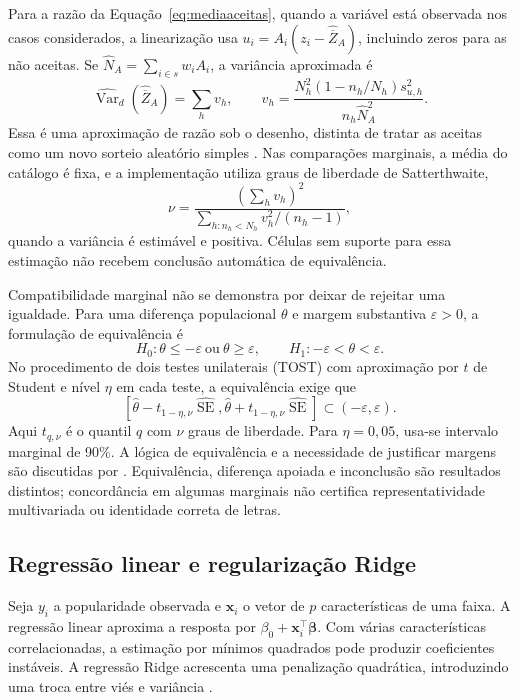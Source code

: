 Para a razão da Equação~\ref{eq:mediaaceitas}, quando a variável está observada nos casos considerados, a linearização usa $u_i=A_i(z_i-\widehat{\overline Z}_A)$, incluindo zeros para as não aceitas. Se $\widehat N_A=\sum_{i\in s}w_iA_i$, a variância aproximada é
\begin{equation}\label{eq:varianciarazao}
 \widehat{\operatorname{Var}}_d(\widehat{\overline Z}_A)=\sum_h v_h,
 \qquad v_h=\frac{N_h^2(1-n_h/N_h)s_{u,h}^2}{n_h\widehat N_A^2}.
\end{equation}
Essa é uma aproximação de razão sob o desenho, distinta de tratar as aceitas como um novo sorteio aleatório simples \cite{statcan2010}. Nas comparações marginais, a média do catálogo é fixa, e a implementação utiliza graus de liberdade de Satterthwaite,
\begin{equation}\label{eq:dfrazao}
 \nu=\frac{(\sum_hv_h)^2}{\sum_{h:n_h<N_h}v_h^2/(n_h-1)},
\end{equation}
quando a variância é estimável e positiva. Células sem suporte para essa estimação não recebem conclusão automática de equivalência.

Compatibilidade marginal não se demonstra por deixar de rejeitar uma igualdade. Para uma diferença populacional $\theta$ e margem substantiva $\varepsilon>0$, a formulação de equivalência é
\begin{equation}\label{eq:equivalencia}
 H_0:\theta\le-\varepsilon\ \text{ou}\ \theta\ge\varepsilon,
 \qquad H_1:-\varepsilon<\theta<\varepsilon.
\end{equation}
No procedimento de dois testes unilaterais (TOST) com aproximação por $t$ de Student e nível $\eta$ em cada teste, a equivalência exige que
\begin{equation}\label{eq:tost}
 [\widehat\theta-t_{1-\eta,\nu}\widehat{\operatorname{SE}},
  \widehat\theta+t_{1-\eta,\nu}\widehat{\operatorname{SE}}]
 \subset(-\varepsilon,\varepsilon).
\end{equation}
Aqui $t_{q,\nu}$ é o quantil $q$ com $\nu$ graus de liberdade. Para $\eta=0,05$, usa-se intervalo marginal de 90\%. A lógica de equivalência e a necessidade de justificar margens são discutidas por . Equivalência, diferença apoiada e inconclusão são resultados distintos; concordância em algumas marginais não certifica representatividade multivariada ou identidade correta de letras.

\subsection{Regressão linear e regularização Ridge}
Seja $y_i$ a popularidade observada e $\bm x_i$ o vetor de $p$ características de uma faixa. A regressão linear aproxima a resposta por $\beta_0+\bm x_i^\top\bm\beta$. Com várias características correlacionadas, a estimação por mínimos quadrados pode produzir coeficientes instáveis. A regressão Ridge acrescenta uma penalização quadrática, introduzindo uma troca entre viés e variância \cite{hastie2009,james2023}.

